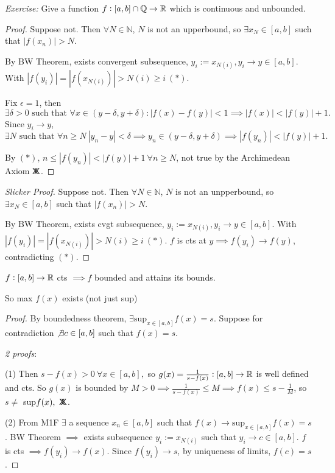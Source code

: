 \documentclass[10pt,twoside]{scrartcl}
\newcommand*{\cont}{%
  \mathsf{X}\mkern-8.5mu\mathsf{X}%
}
\begin{document}
\emph{Exercise:} Give a function $f: [a,b] \cap \mathbb{Q} \to \mathbb{R}$ which is continuous and unbounded. 

\begin{proof}[Proof]
Suppose not. Then $\forall N \in \mathbb{N}$, $N$ is not an upperbound, so $\exists x_N \in [a,b]$ such that $|f(x_n)| > N$.

By BW Theorem, exists convergent subsequence, $y_i := x_{N(i)}, y_i \to y \in [a,b]$. With $|f(y_i)| = |f(x_{N(i)})| > N(i) \geq i ~(*)$. 

Fix $\epsilon =1$, then 
\[\exists \delta > 0\text{ such that }\forall x \in (y-\delta, y + \delta): |f(x) - f(y)| < 1 \implies |f(x)| < |f(y)| +1.\]
 Since $y_i \to y$, 
 \[\exists N\text{ such that }\forall n \geq N~ |y_n - y| < \delta \implies y_n \in (y-\delta, y + \delta) \implies |f(y_n)| < |f(y)| + 1.\]
 
 By $(*)$, $n \leq |f(y_n)| < |f(y)| + 1~ \forall n \geq N$, not true by the Archimedean Axiom $\cont$.
\end{proof}

\begin{proof}[Slicker Proof]
	Suppose not. Then $\forall N \in \mathbb{N}$, $N$ is not an unpperbound, so $\exists x_N \in [a,b]$ such that $|f(x_n)| > N$.
	
By BW Theorem, exists cvgt subsequence, $y_i := x_{N(i)}, y_i \to y \in [a,b]$. With $|f(y_i)| = |f(x_{N(i)})| > N(i) \geq i ~(*)$. $f$ is cts at $y \implies f(y_i) \to f(y)$, contradicting $(*)$.  
\end{proof}\vsp


\vspace*{10pt}
\begin{theorem} $f: [a,b] \to \mathbb{R}$ cts $\implies f$ bounded and attains its bounds.
\end{theorem}

So max $f(x)$ exists (not just sup)

\begin{proof}[Proof]
	By boundedness theorem, $\exists \displaystyle{\text{sup}_{x \in [a,b]}} f(x) = s$. Suppose for contradiction $\not \exists c \in [a,b]$ such that $f(x) = s$. 
	
	\emph{2 proofs}:
	
	(1) Then $s-f(x) > 0 ~\forall x \in [a,b],$ so $g(x) = \frac{1}{s-f(x)}: [a,b] \to \mathbb{R}$ is well defined and cts. So $g(x)$ is bounded by $M > 0 \implies \frac{1}{s-f(x)} \leq M \implies f(x) \leq s - \frac{1}{M}$, so $s \neq$ sup$f(x),~\cont$.\vspace*{10pt}

	(2) From M1F $\exists$ a sequence $x_n \in [a,b]$ such that $f(x) \to  \displaystyle{\text{sup}_{x \in [a,b]}} f(x) = s$. BW Theorem $\implies$ exists subsequence $y_i := x_{N(i)}$ such that $y_i \to c \in [a,b].$ $f$ is cts $\implies f(y_i) \to f(x)$. Since $f(y_i) \to s$, by uniqueness of limits, $f(c) = s$.
	\end{proof}
	
\end{document}
